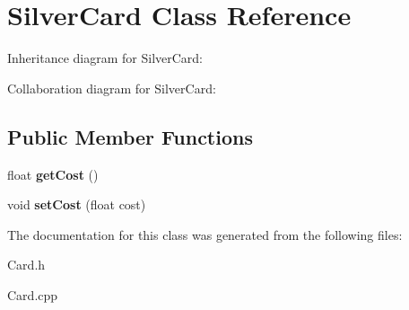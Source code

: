 \hypertarget{classSilverCard}{}\section{Silver\+Card Class Reference}
\label{classSilverCard}


Inheritance diagram for Silver\+Card\+:


Collaboration diagram for Silver\+Card\+:
\subsection*{Public Member Functions}
\begin{DoxyCompactItemize}
\item 
\mbox{\label{classSilverCard_ae47ed86e1bd75b6bb76748bdb3dacbd6}} 
float {\bfseries get\+Cost} ()
\item 
\mbox{\label{classSilverCard_a666581b4244cf4e8b3dd83dbb7001890}} 
void {\bfseries set\+Cost} (float cost)
\end{DoxyCompactItemize}


The documentation for this class was generated from the following files\+:\begin{DoxyCompactItemize}
\item 
Card.\+h\item 
Card.\+cpp\end{DoxyCompactItemize}
